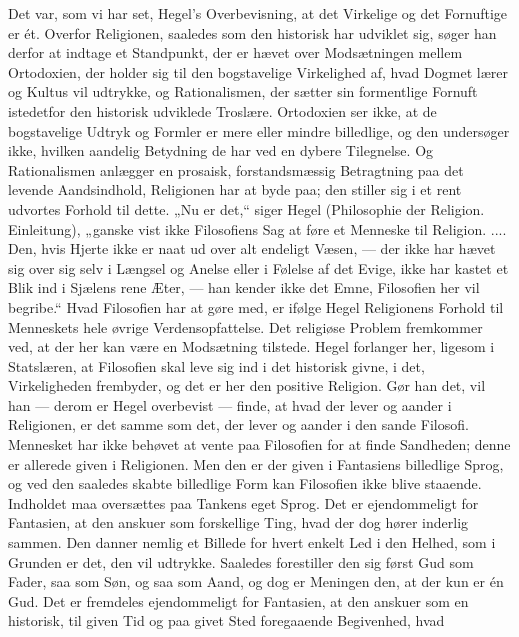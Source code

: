 \documentclass[12pt,a4paper,openany]{book}
\newcommand{\opage}[1]{\marginnote{\footnotesize\textit{[#1]}}}
\begin{document}
Det var, som vi har set, Hegel’s Overbevisning, at det Virkelige og
det Fornuftige er ét. Overfor Religionen, saaledes som den historisk
har udviklet sig, søger han derfor at indtage et Standpunkt, der er
hævet over Modsætningen mellem Ortodoxien, der holder sig til den
bogstavelige Virkelighed af, hvad Dogmet lærer og Kultus vil udtrykke,
og Rationalismen, der sætter sin formentlige Fornuft istedetfor
den historisk udviklede Troslære. Ortodoxien ser ikke, at de bogstavelige
Udtryk og Formler er mere eller mindre billedlige, og den
undersøger ikke, hvilken aandelig Betydning de har ved en dybere
Tilegnelse. Og Rationalismen anlægger en prosaisk, forstandsmæssig
Betragtning paa det levende Aandsindhold, Religionen har at byde
paa; den stiller sig i et rent udvortes Forhold til dette. „Nu er det,“
siger Hegel (Philosophie der Religion. Einleitung), „ganske vist ikke
Filosofiens Sag at føre et Menneske til Religion. .... Den, hvis Hjerte
\opage{125}ikke er naat ud over alt endeligt Væsen, --- der ikke har hævet sig
over sig selv i Længsel og Anelse eller i Følelse af det Evige, ikke har
kastet et Blik ind i Sjælens rene Æter, --- han kender ikke det Emne,
Filosofien her vil begribe.“ Hvad Filosofien har at gøre med, er
ifølge Hegel Religionens Forhold til Menneskets hele øvrige Verdensopfattelse.
Det religiøse Problem fremkommer ved, at der her kan
være en Modsætning tilstede. Hegel forlanger her, ligesom i Statslæren,
at Filosofien skal leve sig ind i det historisk givne, i det, Virkeligheden
frembyder, og det er her den positive Religion. Gør han det,
vil han --- derom er Hegel overbevist --- finde, at hvad der lever og
aander i Religionen, er det samme som det, der lever og aander i den
sande Filosofi. Mennesket har ikke behøvet at vente paa Filosofien
for at finde Sandheden; denne er allerede given i Religionen. Men
den er der given i Fantasiens billedlige Sprog, og ved den saaledes
skabte billedlige Form kan Filosofien ikke blive staaende. Indholdet
maa oversættes paa Tankens eget Sprog. Det er ejendommeligt for
Fantasien, at den anskuer som forskellige Ting, hvad der dog
hører inderlig sammen. Den danner nemlig et Billede for hvert enkelt
Led i den Helhed, som i Grunden er det, den vil udtrykke. Saaledes
forestiller den sig først Gud som Fader, saa som Søn, og saa
som Aand, og dog er Meningen den, at der kun er én Gud. Det er
fremdeles ejendommeligt for Fantasien, at den anskuer som en historisk,
til given Tid og paa givet Sted foregaaende Begivenhed, hvad
\end{document}
